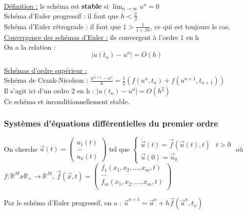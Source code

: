 \documentclass[../main.tex]{subfiles}
\begin{document}
\underline{Définition :} le schéma est \textbf{stable} si $\lim_{n\rightarrow \infty} u^n = 0$\\

Schéma d'Euler progressif : il faut que $h < \frac{2}{\beta}$\\
Schéma d'Euler rétrograde : il faut que $1> \frac{1}{1+\beta h}$, ce qui est toujours le cas.\\

\quad \underline{Convergence des schémas d'Euler :} ils convergent à l'ordre 1 en h\\
On a la relation : \\
\begin{equation}
    \lvert u(t_n) - u^n\rvert  = O(h)
\end{equation}

\quad \underline{Schémas d'ordre supérieur :}\\
Schéma de Crank-Nicolson : $\frac{u^{n+1}-u^n}{h} = \frac{1}{2}(f(u^n, t_n)+f(u^{n+1},t_{n+1}))$\\
Il s'agit ici d'un ordre 2 en h : $\lvert u(t_n) - u^n\rvert = O(h^2)$\\
Ce schéma et inconditionnellement stable. \\

\subsubsection{Systèmes d'équations différentielles du premier ordre}
On cherche $\Vec{u}(t) = \begin{pmatrix}
    u_1(t)\\ \dots \\ u_n(t)
\end{pmatrix}$ tel que $\begin{cases}
    \dot{\Vec{u}}(t) = \Vec{f}(\Vec{u}(t), t) & t>0\\
    \Vec{u}(0) = \Vec{u}_0
\end{cases}$ où $f : \mathbb{R}^M x \mathbb{R}_+ \rightarrow \mathbb{R}^M$, $\Vec{f}(\Vec{x},t) = \begin{pmatrix}
    f_1(x_1, x_2, \dots, x_m, t)\\
    \dots\\
    f_m(x_1, x_2, \dots, x_m, t)\\
\end{pmatrix}$

Par le schéma d'Euler progressif, on a : $\Vec{u}^{n+1} = \Vec{u}^n + h\Vec{f}(\Vec{u}^n, t_n)$\\
\end{document}
